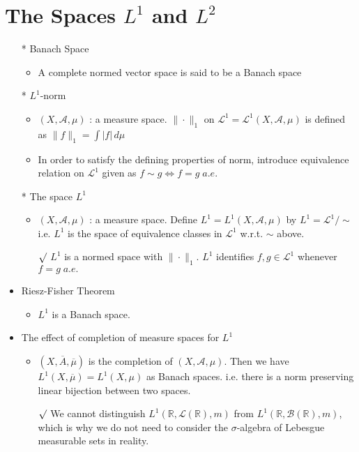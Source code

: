 \documentclass[12pt]{article}
\newcommand{\rmk}{$\surd$}
\newcommand{\R}{\mathbb{R}}
\newcommand{\A}{\mathcal{A}}
\newcommand{\LL}{\mathcal{L}}
\newcommand{\Borel}{\mathcal{B}(\mathbb{R})}
\begin{document}
\section{The Spaces $L^1$ and $L^2$}
\smallskip
\begin{itemize}
    \item [*] Banach Space
    \begin{itemize}
        \item A complete normed vector space is said to be a Banach space
    \end{itemize}
    \item [*] $L^1$-norm
    \begin{itemize}
        \item $(X, \A, \mu)$ : a measure space. $\|\cdot\|_1$ on $\LL^1=\LL^1(X, \A, \mu)$ is defined as $\|f\|_1=\int |f|\, d\mu$
        \item In order to satisfy the defining properties of norm, introduce equivalence relation on $\LL^1$ given as $f\sim g \Leftrightarrow f=g \; a.e.$ 
    \end{itemize}
    \item [*] The space $L^1$
    \begin{itemize}
        \item $(X, \A, \mu)$ : a measure space. Define $L^1=L^1(X,\A, \mu)$ by $L^1=\LL^1/\sim$ i.e. $L^1$ is the space of equivalence classes in $\LL^1$ w.r.t. $\sim$ above. 
        \item[\rmk] $L^1$ is a normed space with $\|\cdot \|_1$. $L^1$ identifies $f,g\in \LL^1$ whenever $f=g\; a.e.$
    \end{itemize}
    \item Riesz-Fisher Theorem
    \begin{itemize}
        \item $L^1$ is a Banach space.
    \end{itemize}
    \item The effect of completion of measure spaces for $L^1$
    \begin{itemize}
        \item $(X, \overline{A}, \overline{\mu})$ is the completion of $(X, \A, \mu)$. Then we have $L^1(X, \overline{\mu})=L^1(X, \mu)$ as Banach spaces. i.e. there is a norm preserving linear bijection between two spaces.
        \item[\rmk] We cannot distinguish $L^1(\R, \LL(\R), m)$ from $L^1(\R, \Borel, m)$, which is why we do not need to consider the $\sigma$-algebra of Lebesgue measurable sets in reality.

\end{itemize}
\end{itemize}
\end{document}
